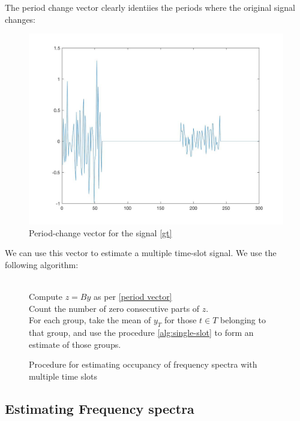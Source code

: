 \begin{definition}
The period change vector clearly identiies the periods where the original signal changes:

\begin{figure}[h]
\centering
\includegraphics[height = 7.3 cm]{z-vec.jpg}
\caption{Period-change vector for the signal \ref{gt}}
\label{fig:period-vec}
\end{figure}

\end{definition}

We can use this vector to estimate a multiple time-slot signal. We use the following algorithm:

\begin{figure}
\begin{algorithmic}[1]
 \\
Compute \(z = By\) as per \eqref{period vector}
 \\
Count the number of zero consecutive parts of \(z\).
\\
For each group, take the mean of \(y_T\) for those \(t \in T\) belonging to that group, and use the procedure \ref{alg:single-slot} to form an estimate of those groups.
   	\EndProcedure
\end{algorithmic}
 \caption{Procedure for estimating occupancy of frequency spectra with multiple time slots}
 \label{alg:multiple-shot}
\end{figure}

\subsection{Estimating Frequency spectra}

